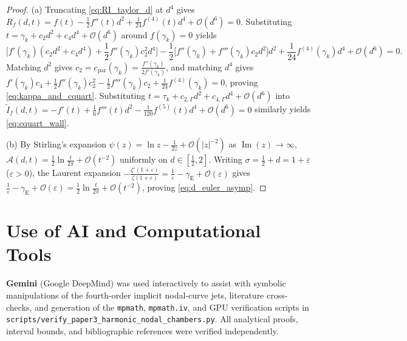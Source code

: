 \documentclass[11pt,a4paper,reqno]{amsart}
\theoremstyle{definition}
\theoremstyle{remark}
\numberwithin{equation}{section}
\newcommand{\Ima}{\operatorname{Im}}
\begin{document}
\begin{proof}
(a) Truncating \eqref{eq:RI_taylor_d} at $d^4$ gives $R_f(d,t) = f(t) - \frac{1}{2}f''(t)d^2 + \frac{1}{24}f^{(4)}(t)d^4 + \mathcal{O}(d^6) = 0$. Substituting $t = \gamma_k + c_2 d^2 + c_4 d^4 + \mathcal{O}(d^6)$ around $f(\gamma_k) = 0$ yields
\[
\Big[f'(\gamma_k)(c_2 d^2 + c_4 d^4) + \frac{1}{2}f''(\gamma_k)c_2^2 d^4\Big] - \frac{1}{2}\Big[f''(\gamma_k) + f'''(\gamma_k)c_2 d^2\Big]d^2 + \frac{1}{24}f^{(4)}(\gamma_k)d^4 + \mathcal{O}(d^6) = 0.
\]
Matching $d^2$ gives $c_2 = c_{\mathrm{par}}(\gamma_k) = \frac{f''(\gamma_k)}{2f'(\gamma_k)}$, and matching $d^4$ gives $f'(\gamma_k)c_4 + \frac{1}{2}f''(\gamma_k)c_2^2 - \frac{1}{2}f'''(\gamma_k)c_2 + \frac{1}{24}f^{(4)}(\gamma_k) = 0$, proving \eqref{eq:kappa_and_cquart}. Substituting $t = \tau_k + c_{2,\Gamma}d^2 + c_{4,\Gamma}d^4 + \mathcal{O}(d^6)$ into $\widetilde{I}_f(d,t) = -f'(t) + \frac{1}{6}f'''(t)d^2 - \frac{1}{120}f^{(5)}(t)d^4 + \mathcal{O}(d^6) = 0$ similarly yields \eqref{eq:cquart_wall}.

(b) By Stirling's expansion $\psi(z) = \ln z - \frac{1}{2z} + \mathcal{O}(|z|^{-2})$ as $\Ima(z) \to \infty$, $\mathcal{A}(d,t) = \frac{1}{2}\ln\frac{t}{2\pi} + \mathcal{O}(t^{-2})$ uniformly on $d \in [\frac{1}{2}, 2]$. Writing $\sigma = \frac{1}{2}+d = 1 + \varepsilon$ ($\varepsilon > 0$), the Laurent expansion $-\frac{\zeta'(1+\varepsilon)}{\zeta(1+\varepsilon)} = \frac{1}{\varepsilon} - \gamma_{\mathrm{E}} + \mathcal{O}(\varepsilon)$ \cite[Section~2.1]{Titchmarsh1986} gives $\frac{1}{\varepsilon} - \gamma_{\mathrm{E}} + \mathcal{O}(\varepsilon) = \frac{1}{2}\ln\frac{t}{2\pi} + \mathcal{O}(t^{-2})$, proving \eqref{eq:d_euler_asymp}.
\end{proof}

\section*{Use of AI and Computational Tools}

\textbf{Gemini} (Google DeepMind) was used interactively to assist with symbolic manipulations of the fourth-order implicit nodal-curve jets, literature cross-checks, and generation of the \texttt{mpmath}, \texttt{mpmath.iv}, and GPU verification scripts in \nolinkurl{scripts/verify_paper3_harmonic_nodal_chambers.py}. All analytical proofs, interval bounds, and bibliographic references were verified independently.
\end{document}

